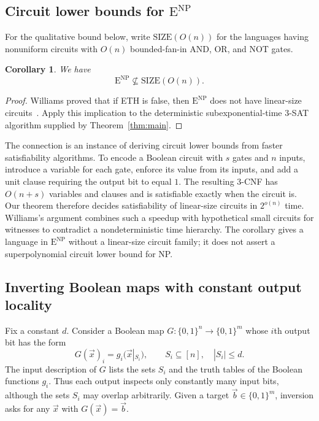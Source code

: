 \documentclass[11pt,reqno]{amsart}
\numberwithin{equation}{section}
\newtheorem{corollary}[theorem]{Corollary}
\theoremstyle{definition}\newtheorem{definition}[theorem]{Definition}
\theoremstyle{remark}\newtheorem{remark}[theorem]{Remark}
\renewcommand{\le}{\leqslant}
\begin{document}
\subsection{Circuit lower bounds for $\mathrm E^{\mathrm{NP}}$}\label{subsec:circuit-lower-bounds}
For the qualitative bound below, write $\mathrm{SIZE}(O(n))$ for the
languages having nonuniform circuits with $O(n)$ bounded-fan-in AND,
OR, and NOT gates.

\begin{corollary}\label{cor:consequence-circuits}
We have
\[
 \mathrm E^{\mathrm{NP}}\not\subseteq\mathrm{SIZE}(O(n)).
\]
\end{corollary}
\begin{proof}
Williams proved that if ETH is false, then
$\mathrm E^{\mathrm{NP}}$ does not have linear-size
circuits~\cite[Theorem~6.1]{Wil13}. Apply this implication to the
deterministic subexponential-time $3$-SAT algorithm supplied by
Theorem~\ref{thm:main}.
\end{proof}

The connection is an instance of deriving circuit lower bounds from
faster satisfiability algorithms. To encode a Boolean circuit with $s$
gates and $n$ inputs, introduce a variable for each gate, enforce its
value from its inputs, and add a unit clause requiring the output bit
to equal $1$. The resulting $3$-CNF has $O(n+s)$ variables and clauses
and is satisfiable exactly when the circuit is. Our theorem therefore
decides satisfiability of linear-size circuits in $2^{o(n)}$ time.
Williams's argument combines
such a speedup with hypothetical small circuits for witnesses to
contradict a nondeterministic time hierarchy. The corollary gives a
language in $\mathrm E^{\mathrm{NP}}$ without a linear-size circuit
family; it does not assert a superpolynomial circuit lower bound for NP.



\subsection{Inverting Boolean maps with constant output locality}\label{subsec:local-inversion}
Fix a constant $d$. Consider a Boolean map
$G:\{0,1\}^n\to\{0,1\}^m$ whose $i$th output bit has the form
\[
 G(\vec{x})_i=g_i(\vec{x}|_{S_i}),
 \qquad S_i\subseteq[n],\quad |S_i|\le d.
\]
The input description of $G$ lists the sets $S_i$ and the truth
tables of the Boolean functions $g_i$. Thus each output inspects
only constantly many input bits, although the sets $S_i$ may overlap
arbitrarily. Given a target $\vec{b}\in\{0,1\}^m$, inversion asks
for any $\vec{x}$ with $G(\vec{x})=\vec{b}$.
\end{document}
